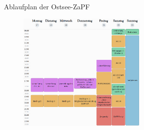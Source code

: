 \documentclass[compress, aspectratio=169]{beamer}
\begin{document}
	\begin{frame}{Ablaufplan der Ostsee-ZaPF}
		\begin{figure}
			\centering
			\includegraphics[height=5.8cm]{Woche2.png}
		\end{figure}
	\end{frame}
	
	
	
	
\end{document}
